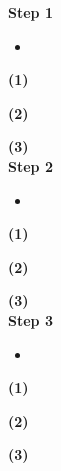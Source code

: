 \documentclass[../main.tex]{subfiles}
\begin{document}
\noindent \textbf{Step 1 }
\begin{itemize}
\item \textbf{}
\end{itemize}
\par \textbf{(1) }
\par \textbf{(2) }
\par \textbf{(3) }
\\
\noindent \textbf{Step 2 }
\begin{itemize}
\item \textbf{}
\end{itemize}
\par \textbf{(1) }
\par \textbf{(2) }
\par \textbf{(3) }
\\
\noindent \textbf{Step 3 }
\begin{itemize}
\item \textbf{}
\end{itemize}
\par \textbf{(1) }
\par \textbf{(2) }
\par \textbf{(3) }
\end{document}
